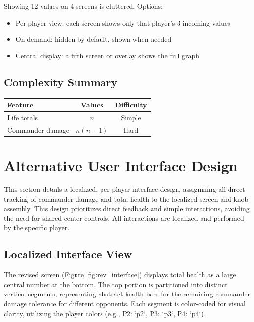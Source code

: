 \documentclass[11pt,a4paper]{article}
\begin{document}
Showing 12 values on 4 screens is cluttered. Options:
\begin{itemize}
    \item Per-player view: each screen shows only that player's 3 incoming values
    \item On-demand: hidden by default, shown when needed
    \item Central display: a fifth screen or overlay shows the full graph
\end{itemize}

\subsection{Complexity Summary}

\begin{center}
\begin{tabular}{lcc}
\hline
\textbf{Feature} & \textbf{Values} & \textbf{Difficulty} \\
\hline
Life totals & $n$ & Simple \\
Commander damage & $n(n-1)$ & Hard \\
\hline
\end{tabular}
\end{center}

\newpage
\section{Alternative User Interface Design}

This section details a localized, per-player interface design, assignining all direct tracking of commander damage and total health to the localized screen-and-knob assembly. This design prioritizes direct feedback and simple interactions, avoiding the need for shared center controls. All interactions are localized and performed by the specific player.

\subsection{Localized Interface View}
The revised screen (Figure \ref{fig:rev_interface}) displays total health as a large central number at the bottom. The top portion is partitioned into distinct vertical segments, representing abstract health bars for the remaining commander damage tolerance for different opponents. Each segment is color-coded for visual clarity, utilizing the player colors (e.g., P2: `p2`, P3: `p3`, P4: `p4`).
\end{document}

